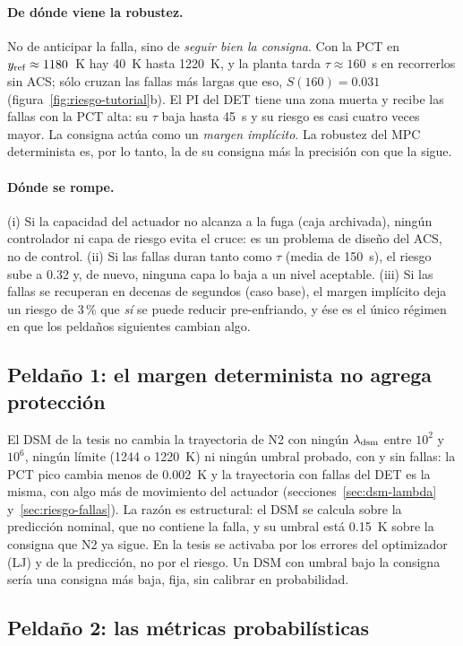 \paragraph{De dónde viene la robustez.} No de anticipar la falla, sino de \emph{seguir bien la
consigna}. Con la PCT en $y_{\rm ref}\approx1180$~K hay 40~K hasta 1220~K, y la planta tarda
$\tau\approx160$~s en recorrerlos sin ACS; sólo cruzan las fallas más largas que eso,
$S(160)=0.031$ (figura~\ref{fig:riesgo-tutorial}b). El PI del DET tiene una zona muerta y recibe
las fallas con la PCT alta: su $\tau$ baja hasta 45~s y su riesgo es casi cuatro veces mayor. La
consigna actúa como un \emph{margen implícito}. La robustez del MPC determinista es, por lo tanto,
la de su consigna más la precisión con que la sigue.

\paragraph{Dónde se rompe.} (i) Si la capacidad del actuador no alcanza a la fuga (caja
archivada), ningún controlador ni capa de riesgo evita el cruce: es un problema de diseño del ACS,
no de control. (ii) Si las fallas duran tanto como $\tau$ (media de 150~s), el riesgo sube a 0.32
y, de nuevo, ninguna capa lo baja a un nivel aceptable. (iii) Si las fallas se recuperan en
decenas de segundos (caso base), el margen implícito deja un riesgo de 3\,\% que \emph{sí} se puede
reducir pre-enfriando, y ése es el único régimen en que los peldaños siguientes cambian algo.

\subsection{Peldaño 1: el margen determinista no agrega protección}
El DSM de la tesis no cambia la trayectoria de N2 con ningún $\lambda_{\rm dsm}$ entre $10^2$ y
$10^6$, ningún límite (1244 o 1220~K) ni ningún umbral probado, con y sin fallas: la PCT pico
cambia menos de 0.002~K y la trayectoria con fallas del DET es la misma, con algo más de
movimiento del actuador (secciones~\ref{sec:dsm-lambda} y~\ref{sec:riesgo-fallas}). La razón es
estructural: el DSM se calcula sobre la predicción nominal, que no contiene la falla, y su umbral
está 0.15~K sobre la consigna que N2 ya sigue. En la tesis se activaba por los errores del
optimizador (LJ) y de la predicción, no por el riesgo. Un DSM con umbral bajo la consigna sería
una consigna más baja, fija, sin calibrar en probabilidad.

\subsection{Peldaño 2: las métricas probabilísticas}
